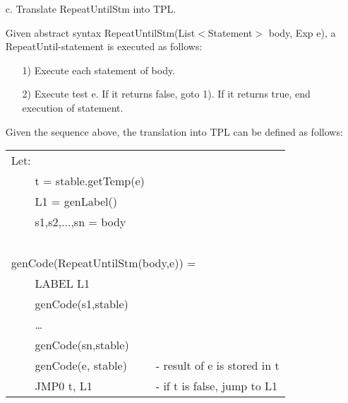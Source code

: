 \documentclass{article}
\begin{document}
\begin{enumerate}
\begin{itemize}
\item[c.] Translate RepeatUntilStm into TPL.

Given abstract syntax RepeatUntilStm(List$<$Statement$>$ body, Exp e), a RepeatUntil-statement is executed as follows:
\begin{itemize}
\item[1)] Execute each statement of body.
\item[2)] Execute test e. If it returns false, goto 1). If it returns true, end execution of statement.
\end{itemize}

Given the sequence above, the translation into TPL can be defined as follows:

\begin{tabular}{lll}
\multicolumn{3}{l}{Let:} \\
$\;\;\;\;$ & t = stable.getTemp(e) &  \\
& L1 = genLabel() & \\
& s1,s2,...,sn = body & \\
\ \\
\multicolumn{3}{l}{genCode(RepeatUntilStm(body,e)) = } \\
& LABEL L1 & \\
& genCode(s1,stable) & \\
& \ldots & \\
& genCode(sn,stable) & \\
& genCode(e, stable) &  - result of e is stored in t \\
& JMP0 t, L1  &  - if t is false, jump to L1
\end{tabular}

\end{itemize}


\end{enumerate}
\end{document}
